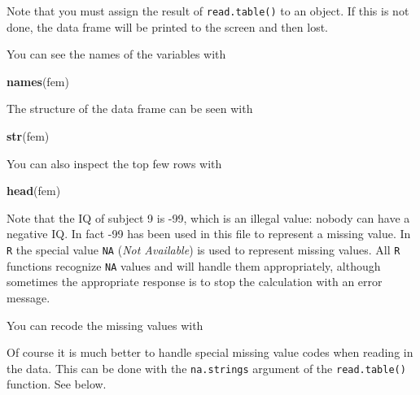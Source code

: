 \documentclass[
]{book}
\newenvironment{Shaded}{\begin{snugshade}}{\end{snugshade}}
\newcommand{\ConstantTok}[1]{\textcolor[rgb]{0.56,0.35,0.01}{#1}}
\newcommand{\DecValTok}[1]{\textcolor[rgb]{0.00,0.00,0.81}{#1}}
\newcommand{\FunctionTok}[1]{\textcolor[rgb]{0.13,0.29,0.53}{\textbf{#1}}}
\newcommand{\NormalTok}[1]{#1}
\newcommand{\OtherTok}[1]{\textcolor[rgb]{0.56,0.35,0.01}{#1}}
\newcommand{\SpecialCharTok}[1]{\textcolor[rgb]{0.81,0.36,0.00}{\textbf{#1}}}
\begin{document}
Note that you must assign the result of \texttt{read.table()} to an
object. If this is not done, the data frame will be printed to the
screen and then lost.

You can see the names of the variables with

\begin{Shaded}
\begin{Highlighting}[]
\FunctionTok{names}\NormalTok{(fem)}
\end{Highlighting}
\end{Shaded}

The structure of the data frame can be seen with

\begin{Shaded}
\begin{Highlighting}[]
\FunctionTok{str}\NormalTok{(fem)}
\end{Highlighting}
\end{Shaded}

You can also inspect the top few rows with

\begin{Shaded}
\begin{Highlighting}[]
\FunctionTok{head}\NormalTok{(fem)}
\end{Highlighting}
\end{Shaded}

Note that the IQ of subject 9 is -99, which is an illegal value:
nobody can have a negative IQ. In fact -99 has been used in this file
to represent a missing value. In \texttt{R} the special value
\texttt{NA} (\emph{Not Available}) is used to represent missing values. All
\texttt{R} functions recognize \texttt{NA} values and will handle them
appropriately, although sometimes the appropriate response is to stop
the calculation with an error message.

You can recode the missing values with

\begin{Shaded}
\end{Shaded}

Of course it is much better to handle special missing value codes
when reading in the data. This can be done with the
\texttt{na.strings} argument of the \texttt{read.table()}
function. See below.
\end{document}
